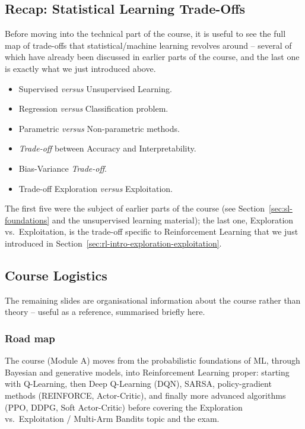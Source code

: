 \subsection{Recap: Statistical Learning Trade-Offs}\label{sec:rl-intro-recap-tradeoffs}

Before moving into the technical part of the course, it is useful to see the full
map of trade-offs that statistical/machine learning revolves around -- several of
which have already been discussed in earlier parts of the course, and the last
one is exactly what we just introduced above.

\begin{itemize}
  \item Supervised \textit{versus} Unsupervised Learning.
  \item Regression \textit{versus} Classification problem.
  \item Parametric \textit{versus} Non-parametric methods.
  \item \textit{Trade-off} between Accuracy and Interpretability.
  \item Bias-Variance \textit{Trade-off}.
  \item Trade-off Exploration \textit{versus} Exploitation.
\end{itemize}

The first five were the subject of earlier parts of the course (see
Section~\ref{sec:sl-foundations} and the unsupervised learning material); the last
one, Exploration vs.\ Exploitation, is the trade-off specific to Reinforcement
Learning that we just introduced in
Section~\ref{sec:rl-intro-exploration-exploitation}.

\subsection{Course Logistics}\label{sec:rl-intro-course-logistics}

The remaining slides are organisational information about the course rather than
theory -- useful as a reference, summarised briefly here.

\subsubsection{Road map}

The course (Module A) moves from the probabilistic foundations of ML, through
Bayesian and generative models, into Reinforcement Learning proper: starting with
Q-Learning, then Deep Q-Learning (DQN), SARSA, policy-gradient methods (REINFORCE,
Actor-Critic), and finally more advanced algorithms (PPO, DDPG, Soft Actor-Critic)
before covering the Exploration vs.\ Exploitation / Multi-Arm Bandits topic and
the exam.

